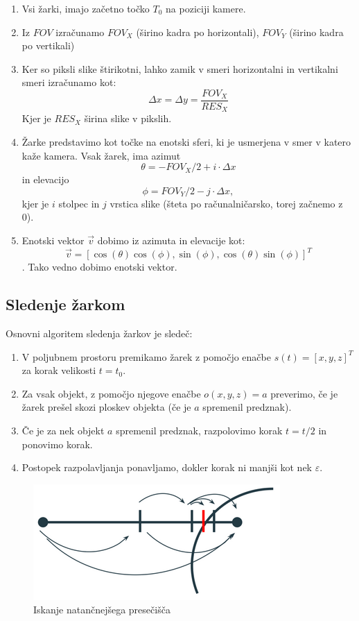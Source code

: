 \documentclass[titlepage]{article}
\begin{document}
\begin{enumerate}
  \item Vsi žarki, imajo začetno točko \(T_{0}\) na poziciji kamere.
  \item Iz \( FOV \) izračunamo \( FOV_X \) (širino kadra po horizontali), \( FOV_Y \) (širino kadra po vertikali)
  \item Ker so piksli slike štirikotni, lahko zamik v smeri horizontalni in vertikalni smeri izračunamo kot:
  \[\Delta x = \Delta y = \frac{FOV_X}{RES_X} \] Kjer je \(RES_X\) širina slike v pikslih.
  \item Žarke predstavimo kot točke na enotski sferi, ki je usmerjena v smer v katero kaže kamera. Vsak žarek, 
  ima azimut \[ \theta = -FOV_X/2 + i \cdot \Delta x \] in elevacijo \[ \phi = FOV_Y/2 - j \cdot \Delta x, \]
  kjer je \( i \) stolpec in \( j \) vrstica slike (šteta po računalničarsko, torej začnemo z 0).
  \item Enotski vektor \( \vec{v} \) dobimo iz azimuta in elevacije kot:
  \[ \vec{v} = [ \cos(\theta) \cos(\phi), \sin(\phi), \cos(\theta) \sin(\phi) ]^T \]. Tako vedno dobimo enotski vektor.
\end{enumerate}

\subsection{Sledenje žarkom}
Osnovni algoritem sledenja žarkov je sledeč:

\begin{enumerate}
\item V poljubnem prostoru premikamo žarek z pomočjo enačbe \( s(t) = [x, y, z]^T \) za korak velikosti \( t = t_0 \).
\item Za vsak objekt, z pomočjo njegove enačbe \( o(x, y, z) = a \) preverimo, če je žarek prešel skozi ploskev 
objekta (če je \( a \) spremenil predznak).
\item Če je za nek objekt \( a \) spremenil predznak, razpolovimo korak \( t = t/2 \) in ponovimo korak.
\item Postopek razpolavljanja ponavljamo, dokler korak ni manjši kot nek \( \varepsilon \).
\end{enumerate}

\begin{figure}[H]
  \centering
  \includegraphics[width=0.5\linewidth]{intersect.png}
  \caption{Iskanje natančnejšega presečišča}
  \label{Slika:Iskanje natančnejšega presečišča}
\end{figure}
\end{document}

